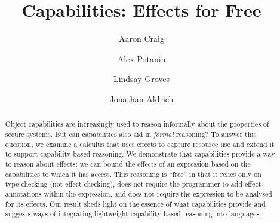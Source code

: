 \documentclass[runningheads]{llncs}
\begin{document}
\title{Capabilities: Effects for Free}

\author{Aaron Craig \and
  Alex Potanin \and
  Lindsay Groves \and
  Jonathan Aldrich}



\maketitle

\begin{abstract}
  Object capabilities are increasingly used to reason informally about
  the properties of secure systems. But can capabilities also aid in
  \textit{formal} reasoning? To answer this question, we examine a
  calculus that uses effects to capture resource use and extend it to
  support capability-based
  reasoning. We demonstrate that capabilities provide a way to reason
  about effects: we can bound the effects of an expression
  based on the capabilities to which it has access.  This reasoning is
  ``free'' in that it relies only on type-checking (not
  effect-checking), does not require the programmer to add effect
  annotations within the expression, and does not require the
  expression to be analysed for its effects. Our result sheds light on
  the essence of what capabilities provide and suggests ways of
  integrating lightweight capability-based reasoning into languages.

\end{abstract}







%
\end{document}
